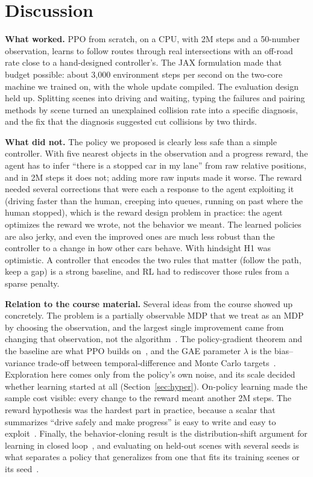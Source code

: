 \documentclass[conference]{IEEEtran}
\begin{document}
\section{Discussion}

\textbf{What worked.} PPO from scratch, on a CPU, with 2M steps and a 50-number
observation, learns to follow routes through real intersections with an off-road rate
close to a hand-designed controller's. The JAX formulation made that budget possible:
about 3,000 environment steps per second on the two-core machine we trained on, with
the whole update compiled. The evaluation design held up. Splitting scenes into driving and waiting,
typing the failures and pairing methods by scene turned an unexplained collision rate
into a specific diagnosis, and the fix that the diagnosis suggested cut collisions by
two thirds.

\textbf{What did not.} The policy we proposed is clearly less safe than a simple
controller. With five nearest objects in the observation and a progress reward, the
agent has to infer ``there is a stopped car in my lane'' from raw relative positions,
and in 2M steps it does not; adding more raw inputs made it worse. The reward needed
several corrections that were each a response to the agent exploiting it (driving
faster than the human, creeping into queues, running on past where the human stopped), which is
the reward design problem in practice: the agent optimizes the reward we wrote, not the
behavior we meant. The learned policies are also
jerky, and even the improved ones are much less robust than the controller to a change
in how other cars behave.
With hindsight H1 was optimistic. A controller that encodes the two rules that matter
(follow the path, keep a gap) is a strong baseline, and RL had to rediscover those rules
from a sparse penalty.

\textbf{Relation to the course material.} Several ideas from the course showed up
concretely. The problem is a partially observable MDP that we treat as an MDP by
choosing the observation, and the largest single improvement came from changing that
observation, not the algorithm~\cite{sutton2018rl}. The policy-gradient
theorem and the baseline are what PPO builds on~\cite{williams1992reinforce}, and the
GAE parameter $\lambda$ is the bias--variance trade-off between temporal-difference and
Monte Carlo targets~\cite{schulman2016gae}. Exploration here comes only from the
policy's own noise, and its scale decided whether learning started at all
(Section~\ref{sec:hyper}). On-policy learning made the sample cost visible: every change
to the reward meant another 2M steps. The reward hypothesis was the hardest part in
practice, because a scalar that summarizes ``drive safely and make progress'' is easy to
write and easy to exploit~\cite{ng1999shaping}. Finally, the behavior-cloning result is
the distribution-shift argument for learning in closed loop~\cite{ross2011dagger}, and
evaluating on held-out scenes with several seeds is what separates a policy that
generalizes from one that fits its training scenes or its seed~\cite{henderson2018matters}.
\end{document}
